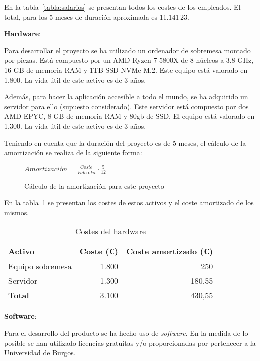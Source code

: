En la tabla~\ref{tabla:salarios} se presentan todos los costes de los empleados.
El total, para los 5 meses de duración aproximada es 11.141\,23\texteuro.

\textbf{Hardware}:

Para desarrollar el proyecto se ha utilizado un ordenador de sobremesa montado
por piezas. Está compuesto por un AMD Ryzen 7 5800X de 8 núcleos a 3.8 GHz, 16
GB de memoria RAM y 1TB SSD NVMe M.2. Este equipo está valorado en
1.800\texteuro. La vida útil de este activo es de 3 años.

Además, para hacer la aplicación accesible a todo el mundo, se ha adquirido un
servidor para ello (supuesto considerado). Este servidor está compuesto por dos
AMD EPYC, 8 GB de memoria RAM y 80gb de SSD. El equipo está valorado en
1.300\texteuro. La vida útil de este activo es de 3 años.

Teniendo en cuenta que la duración del proyecto es de 5 meses, el cálculo de la
amortización se realiza de la siguiente forma:

\begin{figure}[H]
\begin{center}
$Amortización = \frac{Coste}{Vida~útil} \cdot \frac{5}{12}$
\end{center}
\caption{Cálculo de la amortización para este proyecto}
\end{figure}


En la tabla~\ref{tabla:hardware} se presentan los costes de estos activos y el
coste amortizado de los mismos.

\begin{table}[H]
    \centering
\begin{tabular}{lrr}
\toprule
\textbf{Activo}      & \textbf{Coste (€)}      & \textbf{Coste amortizado (€)}      \\ \midrule
Equipo sobremesa     & 1.800                    & 250                      \\
Servidor             & 1.300                    & 180,55                      \\ \midrule
\textbf{Total}       & 3.100                    & 430,55                      \\ \midrule
\end{tabular}
\caption{Costes del hardware}
\label{tabla:hardware}
\end{table}


\textbf{Software}:

Para el desarrollo del producto se ha hecho uso de \textit{software}. En la
medida de lo posible se han utilizado licencias gratuitas y/o proporcionadas por
pertenecer a la Universidad de Burgos.

